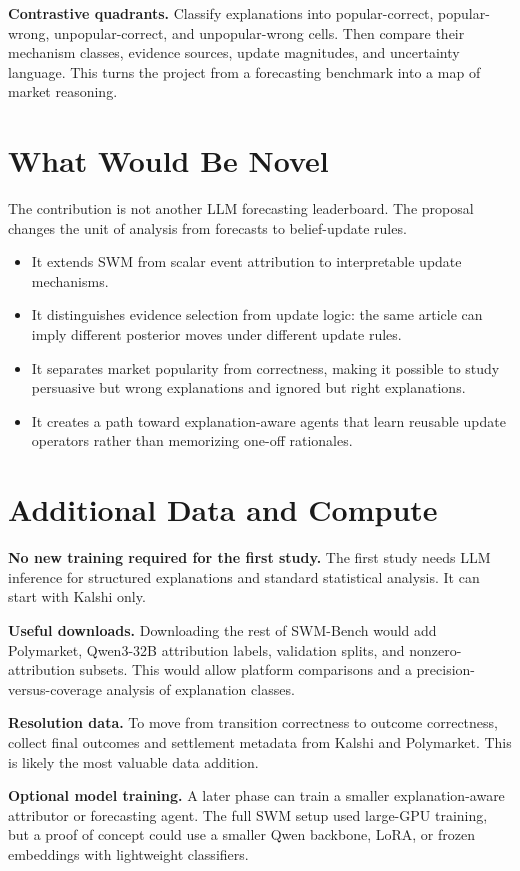 \documentclass[11pt]{article}
\begin{document}
\textbf{Contrastive quadrants.} Classify explanations into popular-correct, popular-wrong, unpopular-correct, and unpopular-wrong cells. Then compare their mechanism classes, evidence sources, update magnitudes, and uncertainty language. This turns the project from a forecasting benchmark into a map of market reasoning.

\section{What Would Be Novel}
The contribution is not another LLM forecasting leaderboard. The proposal changes the unit of analysis from forecasts to belief-update rules.

\begin{itemize}
\item It extends SWM from scalar event attribution to interpretable update mechanisms.
\item It distinguishes evidence selection from update logic: the same article can imply different posterior moves under different update rules.
\item It separates market popularity from correctness, making it possible to study persuasive but wrong explanations and ignored but right explanations.
\item It creates a path toward explanation-aware agents that learn reusable update operators rather than memorizing one-off rationales.
\end{itemize}

\section{Additional Data and Compute}
\textbf{No new training required for the first study.} The first study needs LLM inference for structured explanations and standard statistical analysis. It can start with Kalshi only.

\textbf{Useful downloads.} Downloading the rest of SWM-Bench would add Polymarket, Qwen3-32B attribution labels, validation splits, and nonzero-attribution subsets. This would allow platform comparisons and a precision-versus-coverage analysis of explanation classes.

\textbf{Resolution data.} To move from transition correctness to outcome correctness, collect final outcomes and settlement metadata from Kalshi and Polymarket. This is likely the most valuable data addition.

\textbf{Optional model training.} A later phase can train a smaller explanation-aware attributor or forecasting agent. The full SWM setup used large-GPU training, but a proof of concept could use a smaller Qwen backbone, LoRA, or frozen embeddings with lightweight classifiers.
\end{document}
